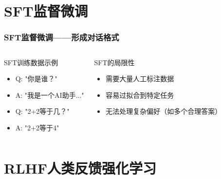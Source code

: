 \documentclass[10pt,aspectratio=169]{beamer}
\begin{document}
\section{SFT监督微调}
\begin{frame}
    \frametitle{SFT监督微调——形成对话格式}
    
    \begin{columns}[T]
        \begin{exampleblock}{SFT训练数据示例}
            \begin{itemize}
                \item Q: "你是谁？"
                \item A: "我是一个AI助手..."
                \item Q: "2+2等于几？"
                \item A: "2+2等于4"
            \end{itemize}
        \end{exampleblock}
        
        \begin{alertblock}{SFT的局限性}
            \begin{itemize}
                \item 需要大量人工标注数据
                \item 容易过拟合到特定任务
                \item 无法处理复杂偏好（如多个合理答案）
            \end{itemize}
        \end{alertblock}
        
    \end{columns}
\end{frame}

\section{RLHF人类反馈强化学习}
\end{document}
